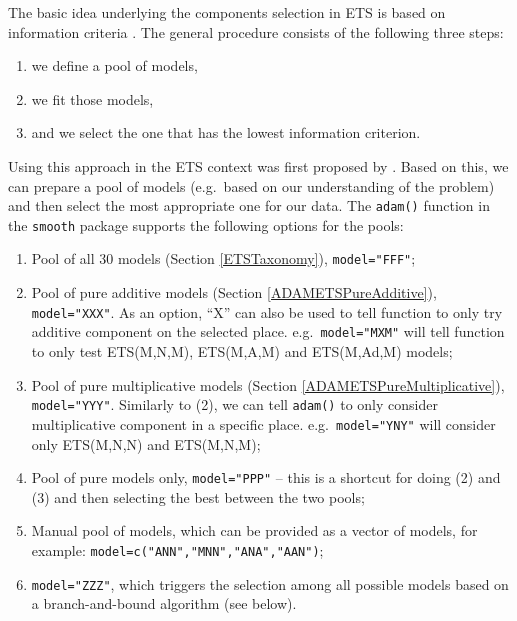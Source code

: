 \documentclass[
]{book}
\providecommand{\tightlist}{%
  \setlength{\itemsep}{0pt}\setlength{\parskip}{0pt}}
\theoremstyle{definition}
\theoremstyle{definition}
\theoremstyle{definition}
\theoremstyle{definition}
\theoremstyle{remark}
\begin{document}
The basic idea underlying the components selection in ETS is based on information criteria \citep[Section 13.3 of][]{SvetunkovSBA}. The general procedure consists of the following three steps:

\begin{enumerate}
\def\labelenumi{\arabic{enumi}.}
\tightlist
\item
  we define a pool of models,
\item
  we fit those models,
\item
  and we select the one that has the lowest information criterion.
\end{enumerate}

Using this approach in the ETS context was first proposed by \citet{Hyndman2002}. Based on this, we can prepare a pool of models (e.g.~based on our understanding of the problem) and then select the most appropriate one for our data. The \texttt{adam()} function in the \texttt{smooth} package supports the following options for the pools:

\begin{enumerate}
\def\labelenumi{\arabic{enumi}.}
\tightlist
\item
  Pool of all 30 models (Section \ref{ETSTaxonomy}), \texttt{model="FFF"};
\item
  Pool of pure additive models (Section \ref{ADAMETSPureAdditive}), \texttt{model="XXX"}. As an option, ``X'' can also be used to tell function to only try additive component on the selected place. e.g.~\texttt{model="MXM"} will tell function to only test ETS(M,N,M), ETS(M,A,M) and ETS(M,Ad,M) models;
\item
  Pool of pure multiplicative models (Section \ref{ADAMETSPureMultiplicative}), \texttt{model="YYY"}. Similarly to (2), we can tell \texttt{adam()} to only consider multiplicative component in a specific place. e.g.~\texttt{model="YNY"} will consider only ETS(M,N,N) and ETS(M,N,M);
\item
  Pool of pure models only, \texttt{model="PPP"} -- this is a shortcut for doing (2) and (3) and then selecting the best between the two pools;
\item
  Manual pool of models, which can be provided as a vector of models, for example: \texttt{model=c("ANN","MNN","ANA","AAN")};
\item
  \texttt{model="ZZZ"}, which triggers the selection among all possible models based on a branch-and-bound algorithm (see below).
\end{enumerate}
\end{document}
